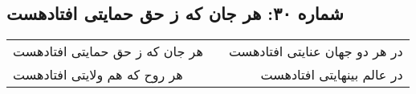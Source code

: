 \begin{center}
\section*{شماره ۳۰: هر جان که ز حق حمایتی افتادهست}
\label{sec:030}
\begin{longtable}{l p{0.5cm} r}
هر جان که ز حق حمایتی افتادهست
&&
در هر دو جهان عنایتی افتادهست
\\
هر روح که هم ولایتی افتادهست
&&
در عالم بینهایتی افتادهست
\\
\end{longtable}
\end{center}
